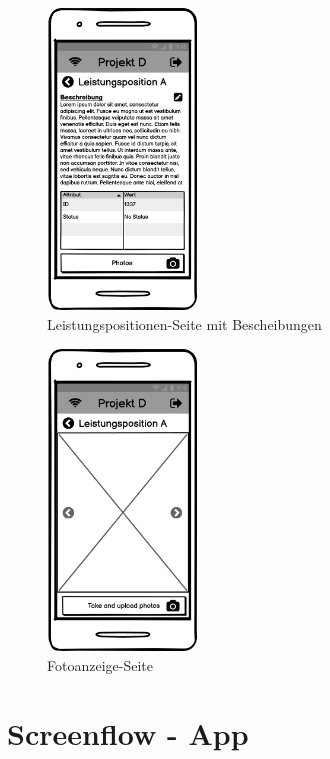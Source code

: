 \begin{figure}[ht]
	\centering
	\includegraphics[width=4cm, height=8cm]{img/mockup-app/Leistungsposition.png}
	\caption{Leistungspositionen-Seite mit Bescheibungen}
\end{figure}

\begin{figure}[ht]
	\centering
	\includegraphics[width=4cm, height=8cm]{img/mockup-app/Photos.png}
	\caption{Fotoanzeige-Seite}
\end{figure}

\clearpage

\section{Screenflow - App}

